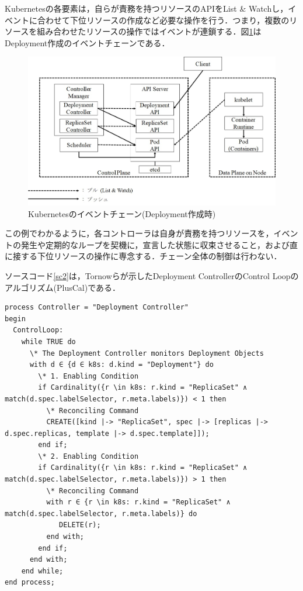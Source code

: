 \documentclass[12pt,a4j]{ujreport}
\begin{document}
Kubernetesの各要素は，自らが責務を持つリソースのAPIをList \& Watchし，イベントに合わせて下位リソースの作成など必要な操作を行う．つまり，複数のリソースを組み合わせたリソースの操作ではイベントが連鎖する．図\ref{fig4}はDeployment作成のイベントチェーンである．

\newpage
\begin{figure}[tb]
    \centerline{\includegraphics[clip,width=140mm]{images/k8s-event-chain.jpg}}
    \caption{Kubernetesのイベントチェーン(Deployment作成時)}\label{fig4}
\end{figure}

この例でわかるように，各コントローラは自身が責務を持つリソースを，イベントの発生や定期的なループを契機に，宣言した状態に収束させること，および直に接する下位リソースの操作に専念する．チェーン全体の制御は行わない．

ソースコード\ref{sc2}は，Tornowらが示したDeployment ControllerのControl Loopのアルゴリズム(PlusCal)である\cite{ref17}．

\newpage
\begin{lstlisting}[caption=Deployment Controllerのアルゴリズム,label=sc2]
process Controller = "Deployment Controller"
begin
  ControlLoop:
    while TRUE do
      \* The Deployment Controller monitors Deployment Objects
      with d ∈ {d ∈ k8s: d.kind = "Deployment"} do
        \* 1. Enabling Condition
        if Cardinality({r \in k8s: r.kind = "ReplicaSet" ∧ match(d.spec.labelSelector, r.meta.labels)}) < 1 then
          \* Reconciling Command
          CREATE([kind |-> "ReplicaSet", spec |-> [replicas |-> d.spec.replicas, template |-> d.spec.template]]);
        end if;
        \* 2. Enabling Condition
        if Cardinality({r \in k8s: r.kind = "ReplicaSet" ∧ match(d.spec.labelSelector, r.meta.labels)}) > 1 then
          \* Reconciling Command
          with r ∈ {r \in k8s: r.kind = "ReplicaSet" ∧ match(d.spec.labelSelector, r.meta.labels)} do
             DELETE(r);
          end with;
        end if;
      end with;
    end while;
end process;
\end{lstlisting}
\end{document}
